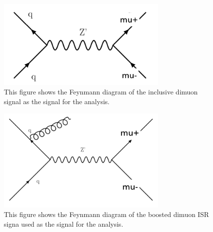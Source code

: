\begin{figure}[!htb]
    \begin{center}
        \includegraphics[width=0.75\textwidth]{figures/chapter_dimuon/dimuonFeynman}
        \caption{
            This figure shows the Feynmann diagram of the inclusive dimuon signal as the signal for the analysis. 
        }
    \label{fig:dimuonFeynmann}
    \end{center}
\end{figure}

\begin{figure}[!htb]
    \begin{center}
        \includegraphics[width=0.75\textwidth]{figures/chapter_dimuon/dimuonISRFeynmann}
        \caption{
        This figure shows the Feynmann diagram of the boosted dimuon ISR signa used as the signal for the analysis. }
            \label{fig:dimuonISRFeynmann}
    \end{center}
\end{figure}




